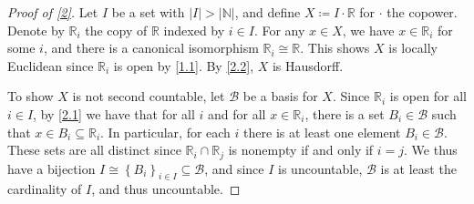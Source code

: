 \documentclass[11pt, letterpaper]{article}
\theoremstyle{theorem}
\begin{document}
\begin{proof}[Proof of \cref{2}]
	Let $I$ be a set with $\left| I \right| >\left| \mathbb{N}  \right| $, and define $X\coloneqq I\cdot \mathbb{R} $ for $\cdot $ the copower. Denote by $\mathbb{R} _i$ the copy of $\mathbb{R} $ indexed by $i\in I$. For any $x\in X$, we have $x\in\mathbb{R} _i$ for some $i$, and there is a canonical isomorphism $\mathbb{R} _i \cong \mathbb{R} $. This shows $X$ is locally Euclidean since $\mathbb{R} _i$ is open by \cref{1.1}. By \cref{2.2}, $X$ is Hausdorff.
	
	To show $X$ is not second countable, let $\mathcal{B} $ be a basis for $X$. Since $\mathbb{R} _i$ is open for all $i\in I$, by \cref{2.1} we have that for all $i$ and for all $x\in\mathbb{R} _i$, there is a set $B_i\in \mathcal{B} $ such that $x\in B_i\subseteq \mathbb{R} _i$. In particular, for each $i$ there is at least one element $B_i\in \mathcal{B} $. These sets are all distinct since $\mathbb{R} _i \cap \mathbb{R} _j$ is nonempty if and only if $i=j$. We thus have a bijection $I\cong \left\{ B_i \right\}_{i\in I} \subseteq \mathcal{B} $, and since $I$ is uncountable, $\mathcal{B} $ is at least the cardinality of $I$, and thus uncountable.
\end{proof}
\end{document}
